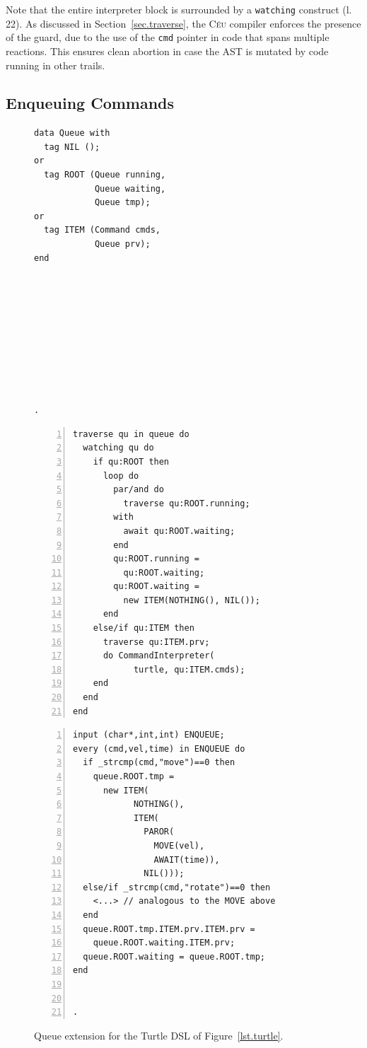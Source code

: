 \documentclass{sig-alternate}
\newcommand{\CEU}{\textsc{C\'{e}u}\xspace}
\newcommand{\code}[1] {{\small{\texttt{#1}}}}
\begin{document}
Note that the entire interpreter block is surrounded by a \code{watching}
construct (l. 22).
As discussed in Section~\ref{sec.traverse}, the \CEU compiler enforces the 
presence of the guard, due to the use of the \code{cmd} pointer in code that 
spans multiple reactions. This ensures clean abortion in case the AST is 
mutated by code running in other trails.

\subsection{Enqueuing Commands}
\label{sub.enqueuing}

\begin{figure}[t]
\begin{minipage}[t]{0.22\linewidth}
\begin{lstlisting}[title=CODE-3: \code{Queue} type]
data Queue with
  tag NIL ();
or
  tag ROOT (Queue running,
            Queue waiting,
            Queue tmp);
or
  tag ITEM (Command cmds,
            Queue prv);
end










.
\end{lstlisting}
\end{minipage}
%
\begin{minipage}[t]{0.36\linewidth}
\begin{lstlisting}[numbers=left,xleftmargin=3.5em,title=CODE-4: Queue traversal]
traverse qu in queue do
  watching qu do
    if qu:ROOT then
      loop do
        par/and do
          traverse qu:ROOT.running;
        with
          await qu:ROOT.waiting;
        end
        qu:ROOT.running =
          qu:ROOT.waiting;
        qu:ROOT.waiting =
          new ITEM(NOTHING(), NIL());
      end
    else/if qu:ITEM then
      traverse qu:ITEM.prv;
      do CommandInterpreter(
            turtle, qu:ITEM.cmds);
    end
  end
end
\end{lstlisting}
\end{minipage}
%
\begin{minipage}[t]{0.39\linewidth}
\begin{lstlisting}[numbers=left,xleftmargin=3.5em,title=CODE-5: Enqueuing commands]
input (char*,int,int) ENQUEUE;
every (cmd,vel,time) in ENQUEUE do
  if _strcmp(cmd,"move")==0 then
    queue.ROOT.tmp =
      new ITEM(
            NOTHING(),
            ITEM(
              PAROR(
                MOVE(vel),
                AWAIT(time)),
              NIL()));
  else/if _strcmp(cmd,"rotate")==0 then
    <...> // analogous to the MOVE above
  end
  queue.ROOT.tmp.ITEM.prv.ITEM.prv =
    queue.ROOT.waiting.ITEM.prv;
  queue.ROOT.waiting = queue.ROOT.tmp;
end


.
\end{lstlisting}
\end{minipage}
%
\caption{ Queue extension for the Turtle DSL of
          Figure~\ref{lst.turtle}.
\label{lst.turtle.queue}
}
\end{figure}
\end{document}
